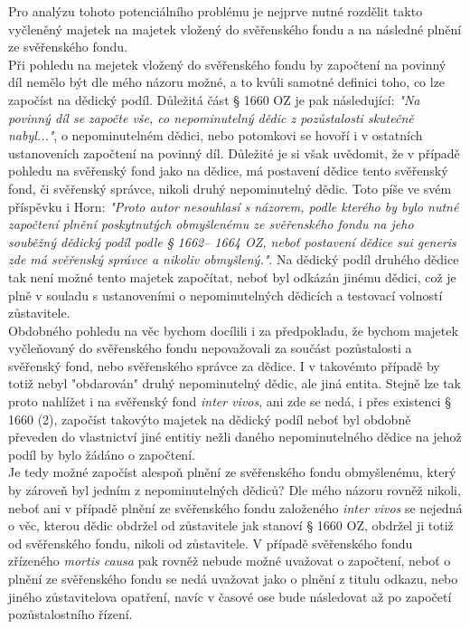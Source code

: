 \documentclass{article}
\begin{document}
Pro analýzu tohoto potenciálního problému je nejprve nutné rozdělit takto vyčleněný majetek na majetek vložený do svěřenského fondu a na následné plnění ze svěřenského fondu.\\

Při pohledu na mejetek vložený do svěřenského fondu by započtení na povinný díl nemělo být dle mého názoru možné, a to kvůli samotné definici toho, co lze započíst na dědický podíl. Důležitá část § 1660 OZ je pak následující: \textit{"Na povinný díl se započte vše, co nepominutelný dědic z pozůstalosti skutečně nabyl..."}, o nepominutelném dědici, nebo potomkovi se hovoří i v ostatních ustanoveních započtení na povinný díl. Důležité je si však uvědomit, že v případě pohledu na svěřenský fond jako na dědice, má postavení dědice tento svěřenský fond, či svěřenský správce, nikoli druhý nepominutelný dědic. Toto píše ve svém příspěvku i Horn: \textit{"Proto autor nesouhlasí s názorem, podle kterého by bylo nutné započtení plnění poskytnutých obmyšlenému ze svěřenského fondu na jeho souběžný dědický podíl podle § 1662– 1664 OZ, neboť postavení dědice sui generis zde má svěřenský správce a nikoliv obmyšlený."}. Na dědický podíl druhého dědice tak není možné tento majetek započítat, neboť byl odkázán jinému dědici, což je plně v souladu s ustanoveními o nepominutelných dědicích a testovací volností zůstavitele.\\

Obdobného pohledu na věc bychom docílili i za předpokladu, že bychom majetek vyčleňovaný do svěřenského fondu nepovažovali za součást pozůstalosti a svěřenský fond, nebo svěřenského správce za dědice. I v takovémto případě by totiž nebyl "obdarován" druhý nepominutelný dědic, ale jiná entita. Stejně lze tak proto nahlížet i na svěřenský fond \textit{inter vivos}, ani zde se nedá, i přes existenci § 1660 (2), započíst takovýto majetek na dědický podíl neboť byl obdobně převeden do vlastnictví jiné entitiy nežli daného nepominutelného dědice na jehož podíl by bylo žádáno o započtení.\\

Je tedy možné započíst alespoň plnění ze svěřenského fondu obmyšlenému, který by zároveň byl jedním z nepominutelných dědiců? Dle mého názoru rovněž nikoli, neboť ani v případě plnění ze svěřenského fondu založeného \textit{inter vivos} se nejedná o věc, kterou dědic obdržel od zůstavitele jak stanoví § 1660 OZ, obdržel ji totiž od svěřenského fondu, nikoli od zůstavitele. V případě svěřenského fondu zřízeného \textit{mortis causa} pak rovněž nebude možné uvažovat o započtení, neboť o plnění ze svěřenského fondu se nedá uvažovat jako o plnění z titulu odkazu, nebo jiného zůstavitelova opatření, navíc v časové ose bude následovat až po započetí pozůstalostního řízení.\\
\end{document}
